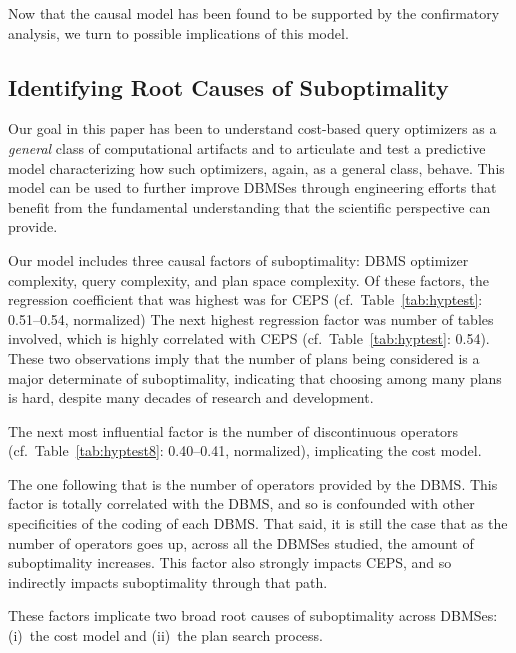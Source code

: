\documentclass[prodmode,acmtods]{acmsmall}
\begin{document}
Now that the causal model has been found to be supported by the confirmatory
\hbox{analysis}, we turn to possible implications of this model.

\subsection{Identifying Root Causes of Suboptimality}\label{sec:root}

Our goal in this paper has been to understand cost-based query optimizers
as a {\em general} class of computational artifacts and to articulate and test
a predictive model \hbox{characterizing} how such optimizers,
again, as a general class, behave.  This model can be used to further
improve \hbox{DBMSes} through engineering \hbox{efforts} that benefit from the fundamental
understanding that the scientific perspective can provide.

Our model includes three causal factors of suboptimality: \hbox{DBMS} optimizer
complexity, query complexity, and plan space complexity. Of these factors,
the regression \hbox{coefficient} that was highest was for CEPS
(cf.~Table~\ref{tab:hyptest}: 0.51--0.54, normalized) The next \hbox{highest}
regression factor was number of tables involved, which is highly correlated
with CEPS (cf.~Table~\ref{tab:hyptest}: 0.54). These two observations imply that the
number of plans being considered is a major determinate of
suboptimality, indicating that choosing among many plans is hard, despite
many decades of research and development.

The next most influential factor is the number of discontinuous operators
(cf.~Table~\ref{tab:hyptest8}: 0.40--0.41, normalized),
\hbox{implicating} the cost model.

The one following that is the number of operators provided by the \hbox{DBMS}.
This factor is totally correlated with the \hbox{DBMS}, and so
is confounded with other specificities of the coding of each \hbox{DBMS}. That said,
it is still the case that as the number of operators goes up, across
all the \hbox{DBMSes} studied, the amount of suboptimality increases. This
\hbox{factor} also strongly impacts CEPS, and so indirectly impacts suboptimality
through that path.

These factors implicate two broad root causes of suboptimality across \hbox{DBMSes}:
(i)~the cost model and (ii)~the plan search process.
\end{document}
